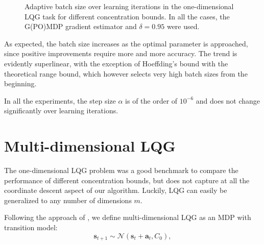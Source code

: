 {\begin{figure}[h!]
\begin{adjustbox}{center}
{	\label{fig:6}
	}
\end{adjustbox}

\caption[Adaptive batch size over learning iterations in the one-dimensional LQG task for different concentration bounds.]{Adaptive batch size over learning iterations in the one-dimensional \ac{LQG} task for different concentration bounds. In all the cases, the G(PO)MDP gradient estimator and $\delta=0.95$ were used.}
\label{fig:8}
\end{figure}
\clearpage
}

As expected, the batch size increases as the optimal parameter is approached, since positive improvements require more and more accuracy. The trend is evidently superlinear, with the exception of Hoeffding's bound with the theoretical range bound, which however selects very high batch sizes from the beginning. 

In all the experiments, the step size $\alpha$ is of the order of $10^{-6}$ and does not change significantly over learning iterations.


\section{Multi-dimensional LQG}\label{sec:lqg2d}
The one-dimensional \ac{LQG} problem was a good benchmark to compare the performance of different concentration bounds, but does not capture at all the coordinate descent aspect of our algorithm. Luckily, \ac{LQG} can easily be generalized to any number of dimensions $m$.

Following the approach of \cite{Pirotta:2015:MRL:2888116.2888124}, we define multi-dimensional \ac{LQG} as an \ac{MDP} with transition model:
\[
	\boldsymbol{s}_{t+1} \sim \mathcal{N}(\boldsymbol{s}_t+\boldsymbol{a}_t,C_0),
\] 

